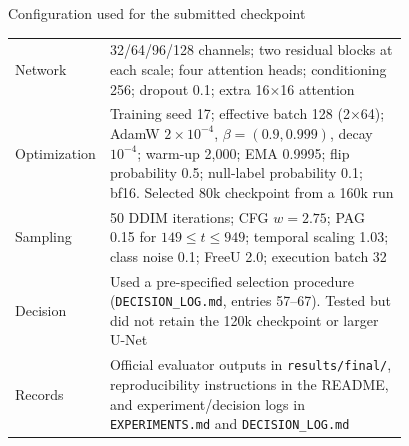 \documentclass[aspectratio=169,10pt,t]{beamer}
\begin{document}
\begin{frame}{Configuration used for the submitted checkpoint}
\footnotesize
\begin{tabular}{@{}lp{0.78\linewidth}@{}}
\toprule
Network & 32/64/96/128 channels; two residual blocks at each scale; four attention heads; conditioning 256; dropout 0.1; extra 16$\times$16 attention \\
Optimization & Training seed 17; effective batch 128 (2$\times$64); AdamW $2{\times}10^{-4}$, $\beta=(0.9,0.999)$, decay $10^{-4}$; warm-up 2{,}000; EMA 0.9995; flip probability 0.5; null-label probability 0.1; bf16. Selected 80k checkpoint from a 160k run \\
Sampling & 50 DDIM iterations; CFG $w=2.75$; PAG 0.15 for $149\le t\le949$; temporal scaling 1.03; class noise 0.1; FreeU 2.0; execution batch 32 \\
Decision & Used a pre-specified selection procedure (\texttt{DECISION\_LOG.md}, entries 57--67). Tested but did not retain the 120k checkpoint or larger U-Net \\
Records & Official evaluator outputs in \texttt{results/final/}, reproducibility instructions in the README, and experiment/decision logs in \texttt{EXPERIMENTS.md} and \texttt{DECISION\_LOG.md} \\
\bottomrule
\end{tabular}
\end{frame}
\end{document}
